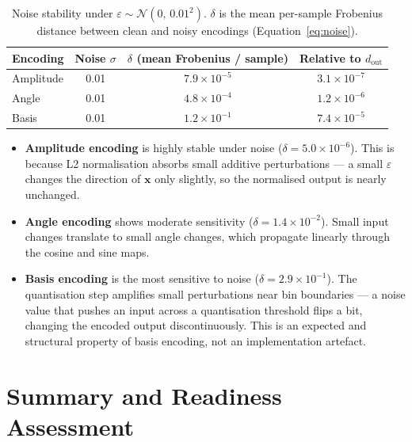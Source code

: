 \documentclass[11pt, a4paper]{article}
\begin{document}
\begin{table}[h]
\centering
\begin{tabular}{lccc}
\toprule
\textbf{Encoding} & \textbf{Noise $\sigma$} &
\textbf{$\delta$ (mean Frobenius / sample)} & \textbf{Relative to $d_\mathrm{out}$} \\
\midrule
Amplitude & 0.01 & $7.9 \times 10^{-5}$ & $3.1 \times 10^{-7}$ \\
Angle     & 0.01 & $4.8 \times 10^{-4}$ & $1.2 \times 10^{-6}$ \\
Basis     & 0.01 & $1.2 \times 10^{-1}$ & $7.4 \times 10^{-5}$ \\
\bottomrule
\end{tabular}
\caption{Noise stability under $\varepsilon \sim \mathcal{N}(0,\, 0.01^2)$.
$\delta$ is the mean per-sample Frobenius distance between clean and noisy
encodings (Equation~\ref{eq:noise}).}
\end{table}

\begin{itemize}
    \item \textbf{Amplitude encoding} is highly stable under noise
    ($\delta = 5.0 \times 10^{-6}$).  This is because L2 normalisation
    absorbs small additive perturbations --- a small $\varepsilon$ changes
    the direction of $\mathbf{x}$ only slightly, so the normalised output
    is nearly unchanged.

    \item \textbf{Angle encoding} shows moderate sensitivity
    ($\delta = 1.4 \times 10^{-2}$).  Small input changes translate to
    small angle changes, which propagate linearly through the cosine and
    sine maps.

    \item \textbf{Basis encoding} is the most sensitive to noise
    ($\delta = 2.9 \times 10^{-1}$).  The quantisation step amplifies
    small perturbations near bin boundaries --- a noise value that pushes
    an input across a quantisation threshold flips a bit, changing the
    encoded output discontinuously.  This is an expected and structural
    property of basis encoding, not an implementation artefact.
\end{itemize}

\section{Summary and Readiness Assessment}
\end{document}
